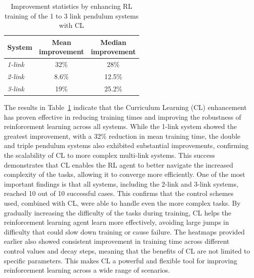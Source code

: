 \begin{table}[ht]
	\centering
	\caption{Improvement statistics by enhancing RL training of the 1 to 3 link pendulum systems with CL}
	\begin{tabular}{@{}lcc@{}}
		\toprule
		\textbf{System} & \makecell{\textbf{Mean}\\ \textbf{improvement}} & \makecell{\textbf{Median}\\ \textbf{improvement}} \\ \midrule
		\textit{1-link} & 32\% & 28\% \\
		\textit{2-link} & 8.6\% & 12.5\% \\
		\textit{3-link} & 19\% & 25.2\% \\ \bottomrule
	\end{tabular}
	\label{tab: CL improvement statistics}
\end{table}

The results in Table~\ref{tab: CL improvement statistics} indicate that the Curriculum Learning (CL) enhancement has proven effective in reducing training times and improving the robustness of reinforcement learning across all systems. While the 1-link system showed the greatest improvement, with a 32\% reduction in mean training time, the double and triple pendulum systems also exhibited substantial improvements, confirming the scalability of CL to more complex multi-link systems. This success demonstrates that CL enables the RL agent to better navigate the increased complexity of the tasks, allowing it to converge more efficiently. 
One of the most important findings is that all systems, including the 2-link and 3-link systems, reached 10 out of 10 successful cases. This confirms that the control schemes used, combined with CL, were able to handle even the more complex tasks. By gradually increasing the difficulty of the tasks during training, CL helps the reinforcement learning agent learn more effectively, avoiding large jumps in difficulty that could slow down training or cause failure. The heatmaps provided earlier also showed consistent improvement in training time across different control values and decay steps, meaning that the benefits of CL are not limited to specific parameters. This makes CL a powerful and flexible tool for improving reinforcement learning across a wide range of scenarios. 


